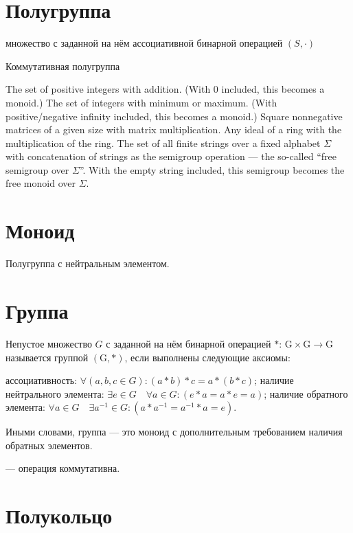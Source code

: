 \section{Полугруппа}


множество с заданной на нём ассоциативной бинарной операцией $(S,\cdot )$ 


Коммутативная полугруппа


The set of positive integers with addition. (With 0 included, this becomes a monoid.)
The set of integers with minimum or maximum. (With positive/negative infinity included, this becomes a monoid.)
Square nonnegative matrices of a given size with matrix multiplication.
Any ideal of a ring with the multiplication of the ring.
The set of all finite strings over a fixed alphabet $\Sigma$ with concatenation of strings as the semigroup operation — the so-called ``free semigroup over $\Sigma$''. With the empty string included, this semigroup becomes the free monoid over $\Sigma$.


\section{Моноид}


Полугруппа с нейтральным элементом.



\section{Группа}


Непустое множество $G$ с заданной на нём бинарной операцией $*$: $ \mathrm {G} \times \mathrm {G} \rightarrow \mathrm {G}$ называется группой $ (\mathrm {G} ,*)$, если выполнены следующие аксиомы:

ассоциативность: $\forall (a,b,c\in G)\colon (a*b)*c=a*(b*c)$;
наличие нейтрального элемента: $ \exists e\in G\quad \forall a\in G\colon (e*a=a*e=a)$;
наличие обратного элемента: $ \forall a\in G\quad \exists a^{-1}\in G\colon (a*a^{-1}=a^{-1}*a=e)$.

Иными словами, группа --- это моноид с дополнительным требованием наличия обратных элементов.

\begin{definition} --- операция коммутативна.
\end{definition}


\section{Полукольцо}

